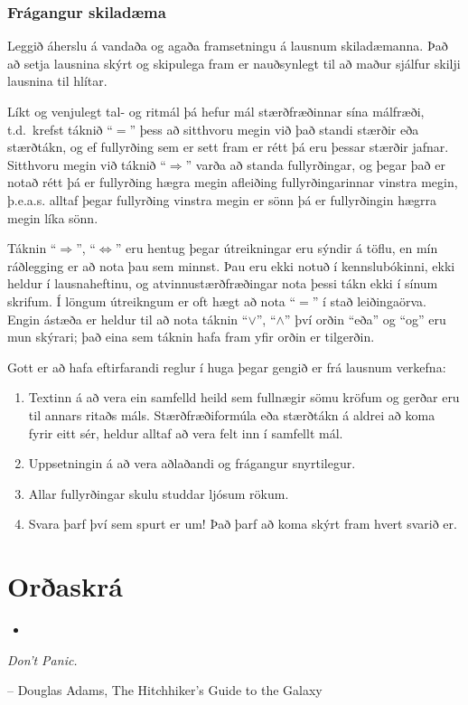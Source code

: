 \documentclass[a4paper,10pt,icelandic]{sphinxmanual}
\begin{document}
\subsection{Frágangur skiladæma}
\label{vidauki:id1}
Leggið áherslu á vandaða og agaða framsetningu á lausnum
skiladæmanna.  Það að setja lausnina skýrt og skipulega fram er
nauðsynlegt til að maður sjálfur skilji lausnina til hlítar.

Líkt og venjulegt tal- og ritmál þá hefur mál stærðfræðinnar sína
málfræði, t.d. krefst táknið ``\(=\)'' þess að sitthvoru megin við
það standi stærðir eða stærðtákn, og ef fullyrðing sem er sett fram er
rétt þá eru þessar stærðir jafnar. Sitthvoru megin við táknið
``\(\Rightarrow\)'' varða að standa fullyrðingar, og þegar það er
notað rétt þá er fullyrðing hægra megin afleiðing fullyrðingarinnar
vinstra megin, þ.e.a.s. alltaf þegar fullyrðing vinstra megin er sönn þá
er fullyrðingin hægrra megin líka sönn.

Táknin ``\(\Rightarrow\)'', ``\(\Leftrightarrow\)'' eru hentug
þegar útreikningar eru sýndir á töflu, en mín ráðlegging er að nota þau
sem minnst. Þau eru ekki notuð í kennslubókinni, ekki heldur í
lausnaheftinu, og atvinnustærðfræðingar nota þessi tákn ekki í sínum
skrifum. Í löngum útreikngum er oft hægt að nota ``\(=\)'' í stað
leiðingaörva. Engin ástæða er heldur til að nota táknin
``\(\vee\)'', ``\(\wedge\)'' því orðin ``eða'' og ``og'' eru mun
skýrari; það eina sem táknin hafa fram yfir orðin er tilgerðin.

Gott er að hafa eftirfarandi reglur í huga þegar gengið er frá lausnum
verkefna:
\begin{enumerate}
\item {} 
Textinn á að vera ein samfelld heild sem fullnægir sömu kröfum og
gerðar eru til annars ritaðs máls. Stærðfræðiformúla eða stærðtákn á
aldrei að koma fyrir eitt sér, heldur alltaf að vera felt inn í samfellt
mál.

\item {} 
Uppsetningin á að vera aðlaðandi og frágangur snyrtilegur.

\item {} 
Allar fullyrðingar skulu studdar ljósum rökum.

\item {} 
Svara þarf því sem spurt er um! Það þarf að koma skýrt fram hvert
svarið er.

\end{enumerate}


\chapter{Orðaskrá}
\label{ordaskra::doc}\label{ordaskra:oraskra}\begin{itemize}
\item {} 

\end{itemize}

\emph{Don't Panic.}

-- Douglas Adams, The Hitchhiker's Guide to the Galaxy



\renewcommand{\indexname}{Atriðaskrá}
\printindex
\end{document}
